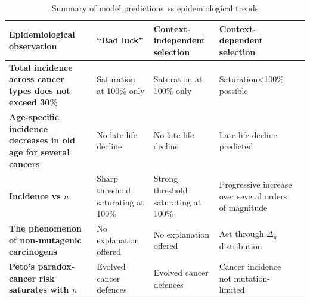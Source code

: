 \documentclass[10pt,twocolumn,twoside]{article}
\begin{document}
\begin{table}[tbhp]
\centering
\begin{threeparttable}
\begin{tabular}{p{5cm}p{4cm}p{4cm}p{3.5cm}p{7cm}}
\textbf{Epidemiological observation} & ``Bad luck'' & Context-independent selection & Context-dependent selection \\
\hline
\textbf{Total incidence across cancer types does not exceed 30\%} & Saturation at 100\% only & Saturation at 100\% only & Saturation<100\% possible \\
\textbf{Age-specific incidence decreases in old age for several cancers} & No late-life decline & No late-life decline & Late-life decline predicted \\
\textbf{Incidence vs $n$} & Sharp threshold saturating at 100\% & Strong threshold saturating at 100\% & Progressive increase over several orders of magnitude \\
\textbf{The phenomenon of non-mutagenic carcinogens} & No explanation offered & No explanation offered & Act through $\Delta_{g}$ distribution \\
\textbf{Peto's paradox-cancer risk saturates with $n$} & Evolved cancer defences & Evolved cancer defences & Cancer incidence not mutation-limited \\
\hline
\end{tabular}
\caption{Summary of model predictions vs epidemiological trends}
\end{threeparttable}
\label{Table 1}
\end{table}
\end{document}
